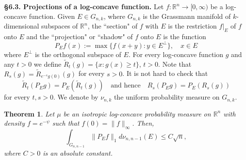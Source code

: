 \documentclass[11pt,leqno]{article}
\newtheorem{theorem}{Theorem}[section]
\theoremstyle{definition}
\theoremstyle{remark}
\numberwithin{equation}{section}
\newcommand{\ls}{\leqslant}
\newcommand{\gr}{\geqslant}
\newcommand{\1}{\textbf{1}}
\begin{document}
\noindent \textbf{\S 6.3. Projections of a log-concave function.} Let $f:{\mathbb R}^n\to [0,\infty)$ be a log-concave function. 
Given $E\in G_{n,k}$, where $G_{n,k}$ is the Grassmann manifold of $k$-dimensional subspaces of ${\mathbb R}^n$, the ``section" of 
$f$ with $E$ is the restriction $f\big|_E$ of $f$ onto $E$ and the ``projection" or ``shadow" of $f$ onto $E$ is the function
$$P_Ef(x):=\max\{f(x+y):y\in E^{\perp}\},\quad x\in E$$
where $E^{\perp}$ is the orthogonal subspace of $E$. For every log-concave function $g$ and any $t>0$ we define $\tilde{R}_t(g)=\{x:g(x)\gr t\}$, $t>0$. Note that $R_s(g)=\tilde{R}_{e^{-s}g(0)}(g)$ for every $s>0$. It is not hard to check that
\begin{equation}\label{eq:RP=PR}\tilde{R}_t(P_Eg)=P_E(\tilde{R}_t(g))\quad\text{and hence}\quad R_s(P_Eg)=P_E(R_s(g))\end{equation}
for every $t,s>0$. We denote by $\nu_{n,k}$ the uniform probability measure on $G_{n,k}$.

\begin{theorem}\label{th:projections-f}Let $\mu$ be an isotropic log-concave probability measure on $\mathbb{R}^n$ with density $f=e^{-\psi}$
such that $f(0)=\|f\|_{\infty}$. Then,
$$\int_{G_{n,n-1}}\|P_Ef\|_1d\nu_{n,n-1}(E)\ls C\sqrt{n},$$
where $C>0$ is an absolute constant.
\end{theorem}
\end{document}
